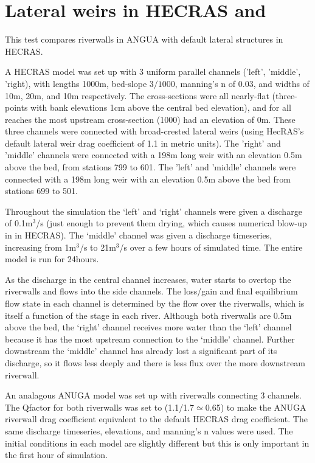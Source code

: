 \section{Lateral weirs in HECRAS and \anuga{}}

This test compares riverwalls in ANGUA with default lateral structures in
HECRAS. 

A HECRAS model was set up with 3 uniform parallel channels ('left',
'middle', 'right), with lengths 1000m, bed-slope $3/1000$, manning's n of 0.03,
and widths of 10m, 20m, and 10m respectively. The cross-sections were all
nearly-flat (three-points with bank elevations 1cm above the central bed
elevation), and for all reaches the most upstream cross-section (1000) had an
elevation of 0m. These three channels were connected with broad-crested lateral
weirs (using HecRAS's default lateral weir drag coefficient of 1.1 in metric
units). The 'right' and 'middle' channels were connected with a 198m long weir
with an elevation 0.5m above the bed, from stations 799 to 601. The 'left' and
'middle' channels were connected with a 198m long weir with an elevation 0.5m
above the bed from stations 699 to 501. 

Throughout the simulation the `left' and `right' channels were given a
discharge of 0.1m$^3$/s (just enough to prevent them drying, which causes numerical
blow-up in in HECRAS). The `middle' channel was given a discharge timeseries,
increasing from 1m$^3$/s to 21m$^3$/s over a few hours of simulated time. The entire model
is run for 24hours.

As the discharge in the central channel increases, water starts to overtop the
riverwalls and flows into the side channels. The loss/gain and final
equilibrium flow state in each channel is determined by the flow over the
riverwalls, which is itself a function of the stage in each river. Although
both riverwalls are 0.5m above the bed, the `right' channel receives more water
than the `left' channel because it has the most upstream connection to the
`middle' channel. Further downstream the `middle' channel has already lost a
significant part of its discharge, so it flows less deeply and there is less flux over
the more downstream riverwall.

An analagous ANUGA model was set up with riverwalls connecting 3 channels.
The Qfactor for both riverwalls was set to (1.1/1.7$\simeq$0.65) to make the ANUGA
riverwall drag coefficient equivalent to the default HECRAS drag coefficient. The
same discharge timeseries, elevations, and manning's n values were used. The
initial conditions in each model are slightly different but this is only
important in the first hour of simulation.

